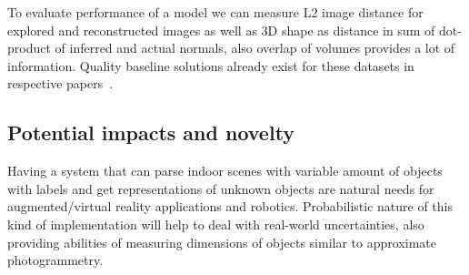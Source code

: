 To evaluate performance of a model we can measure L2 image distance for explored and reconstructed images as well as 3D shape as distance in sum of dot-product of inferred and actual normals, also overlap of volumes provides a lot of information. Quality baseline solutions already exist for these datasets in respective papers~\cite{dai2017scannet,armeni2017joint}.

\subsection{Potential impacts and novelty}
Having a system that can parse indoor scenes with variable amount of objects with labels and get representations of unknown objects are natural needs for augmented/virtual reality applications and robotics. Probabilistic nature of this kind of implementation will help to deal with real-world uncertainties, also providing abilities of measuring dimensions of objects similar to approximate photogrammetry.